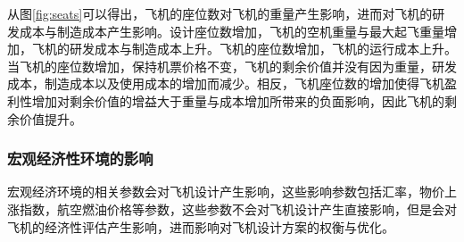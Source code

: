\documentclass[12pt,a4paper]{report}
\begin{document}
从图\ref{fig:seats}可以得出，飞机的座位数对飞机的重量产生影响，进而对飞机的研发成本与制造成本产生影响。设计座位数增加，飞机的空机重量与最大起飞重量增加，飞机的研发成本与制造成本上升。飞机的座位数增加，飞机的运行成本上升。当飞机的座位数增加，保持机票价格不变，飞机的剩余价值并没有因为重量，研发成本，制造成本以及使用成本的增加而减少。相反，飞机座位数的增加使得飞机盈利性增加对剩余价值的增益大于重量与成本增加所带来的负面影响，因此飞机的剩余价值提升。

\subsubsection{宏观经济性环境的影响}
宏观经济环境的相关参数会对飞机设计产生影响，这些影响参数包括汇率，物价上涨指数，航空燃油价格等参数，这些参数不会对飞机设计产生直接影响，但是会对飞机的经济性评估产生影响，进而影响对飞机设计方案的权衡与优化。
\end{document}
